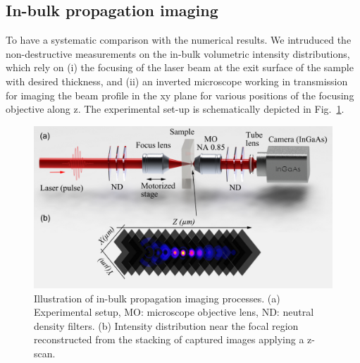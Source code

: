 \documentclass[9pt,twocolumn,twoside]{osajnl}
\begin{document}
\subsection{In-bulk propagation imaging}
To have a systematic comparison with the numerical results. We intruduced the non-destructive measurements on the in-bulk volumetric intensity distributions, which rely on (i) the focusing of the laser beam at the exit surface of the sample with desired thickness, and (ii) an inverted microscope working in transmission for imaging the beam profile in the xy plane for various positions of the focusing objective along z. The experimental set-up is schematically depicted in Fig.~\ref{fig:2}.
\begin{figure}
	\centering
	\includegraphics[width=\linewidth]{../AppOptics/figures/setup.pdf}
	\caption{Illustration of in-bulk propagation imaging processes. (a) Experimental setup, MO: microscope objective lens, ND: neutral density filters. (b) Intensity distribution near the focal region reconstructed from the stacking of captured images applying a z-scan.}\label{fig:2}
\end{figure}
\end{document}
